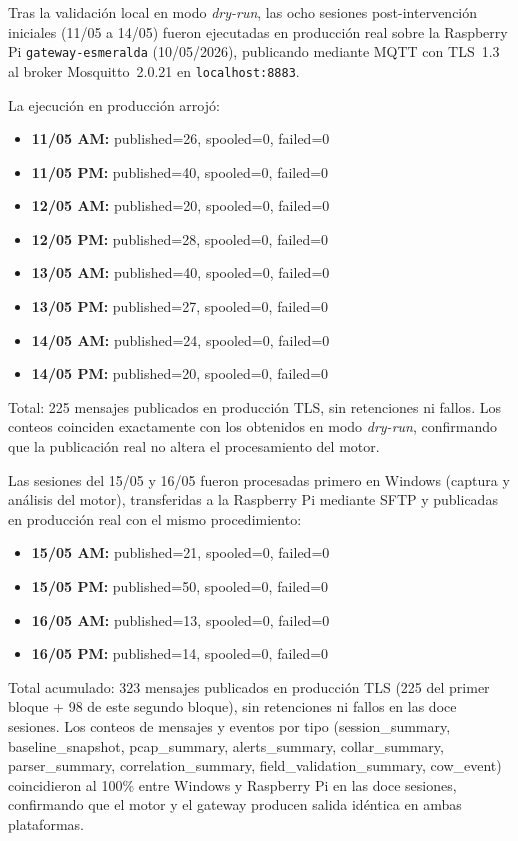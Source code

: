 Tras la validación local en modo \textit{dry-run}, las ocho sesiones post-intervención iniciales (11/05 a 14/05) fueron ejecutadas en producción real sobre la Raspberry Pi \texttt{gateway-esmeralda} (10/05/2026), publicando mediante MQTT con TLS~1.3 al broker Mosquitto~2.0.21 en \texttt{localhost:8883}.

La ejecución en producción arrojó:

\begin{itemize}
    \item \textbf{11/05 AM:} published=26, spooled=0, failed=0
    \item \textbf{11/05 PM:} published=40, spooled=0, failed=0
    \item \textbf{12/05 AM:} published=20, spooled=0, failed=0
    \item \textbf{12/05 PM:} published=28, spooled=0, failed=0
    \item \textbf{13/05 AM:} published=40, spooled=0, failed=0
    \item \textbf{13/05 PM:} published=27, spooled=0, failed=0
    \item \textbf{14/05 AM:} published=24, spooled=0, failed=0
    \item \textbf{14/05 PM:} published=20, spooled=0, failed=0
\end{itemize}

Total: 225 mensajes publicados en producción TLS, sin retenciones ni fallos. Los conteos coinciden exactamente con los obtenidos en modo \textit{dry-run}, confirmando que la publicación real no altera el procesamiento del motor.

Las sesiones del 15/05 y 16/05 fueron procesadas primero en Windows (captura y análisis del motor), transferidas a la Raspberry Pi mediante SFTP y publicadas en producción real con el mismo procedimiento:

\begin{itemize}
    \item \textbf{15/05 AM:} published=21, spooled=0, failed=0
    \item \textbf{15/05 PM:} published=50, spooled=0, failed=0
    \item \textbf{16/05 AM:} published=13, spooled=0, failed=0
    \item \textbf{16/05 PM:} published=14, spooled=0, failed=0
\end{itemize}

Total acumulado: 323 mensajes publicados en producción TLS (225 del primer bloque + 98 de este segundo bloque), sin retenciones ni fallos en las doce sesiones. Los conteos de mensajes y eventos por tipo (session\_summary, baseline\_snapshot, pcap\_summary, alerts\_summary, collar\_summary, parser\_summary, correlation\_summary, field\_validation\_summary, cow\_event) coincidieron al 100\% entre Windows y Raspberry Pi en las doce sesiones, confirmando que el motor y el gateway producen salida idéntica en ambas plataformas.

